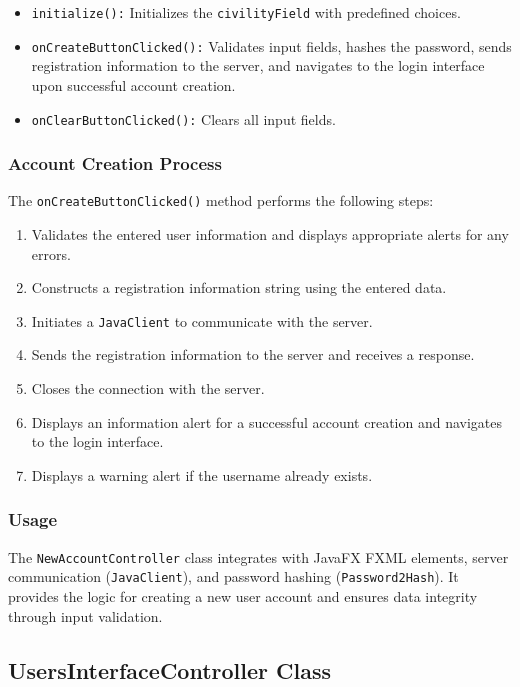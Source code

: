 \documentclass{article}
\begin{document}
\begin{itemize}
    \item \texttt{initialize():} Initializes the \texttt{civilityField} with predefined choices.
    \item \texttt{onCreateButtonClicked():} Validates input fields, hashes the password, sends registration information to the server, and navigates to the login interface upon successful account creation.
    \item \texttt{onClearButtonClicked():} Clears all input fields.
\end{itemize}

\subsubsection{Account Creation Process}

The \texttt{onCreateButtonClicked()} method performs the following steps:

\begin{enumerate}
    \item Validates the entered user information and displays appropriate alerts for any errors.
    \item Constructs a registration information string using the entered data.
    \item Initiates a \texttt{JavaClient} to communicate with the server.
    \item Sends the registration information to the server and receives a response.
    \item Closes the connection with the server.
    \item Displays an information alert for a successful account creation and navigates to the login interface.
    \item Displays a warning alert if the username already exists.
\end{enumerate}

\subsubsection{Usage}

The \texttt{NewAccountController} class integrates with JavaFX FXML elements, server communication (\texttt{JavaClient}), and password hashing (\texttt{Password2Hash}). It provides the logic for creating a new user account and ensures data integrity through input validation.

\subsection{UsersInterfaceController Class}
\end{document}
